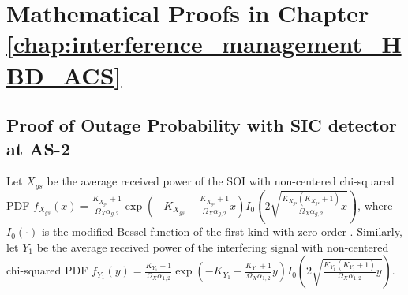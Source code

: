 \appendixpage
\addappheadtotoc

\chapter{Mathematical Proofs in Chapter \ref{chap:interference_management_HBD_ACS}} 
\label{chap:Appendix_A}
\section{Proof of Outage Probability with SIC detector at AS-2} \label{interference_management_HBD_ACS_SIC_proof}
Let $X_{gs}$ be the average received power of the SOI with non-centered chi-squared PDF $f_{X_{gs}}(x) = \frac{K_{X_{gs}}+1}{\Omega_{X}\alpha_{g,2}} \exp\left(-K_{X_{gs}}-\frac{K_{X_{gs}} + 1}{\Omega_{X}\alpha_{g,2}}x\right) I_{0}\left(2\sqrt{\frac{K_{X_{gs}}(K_{X_{gs}}+1)}{\Omega_{X}\alpha_{g,2}}x}\right)$, where $I_{0}\left(\cdot\right)$ is the modified Bessel function of the first kind with zero order \cite[Eq. (8.445)]{gradshteyn2014table}. Similarly, let $Y_1$ be the average received power of the interfering signal with non-centered chi-squared PDF $f_{Y_1}(y) = \frac{K_{Y_1}+1}{\Omega_{X}\alpha_{1,2}}\exp\left(-K_{Y_1}-\frac{K_{Y_1} + 1}{\Omega_{X}\alpha_{1,2}}y\right) I_{0}\left(2\sqrt{\frac{K_{Y_1}(K_{Y_1}+1)}{\Omega_{X}\alpha_{1,2}}y}\right)$. 

